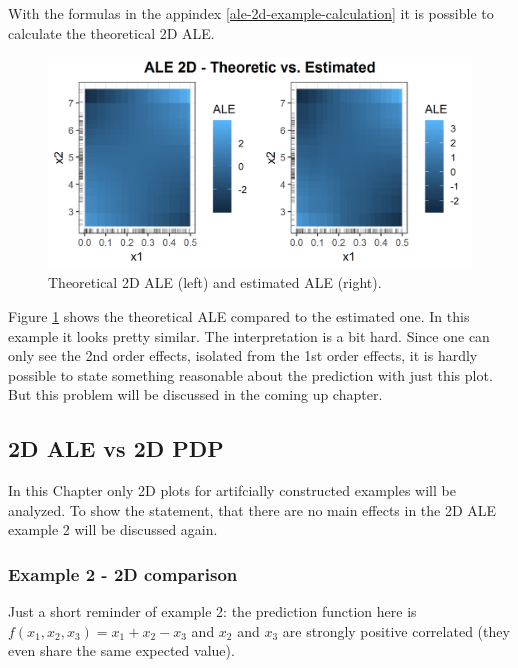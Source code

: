 \documentclass[
]{krantz}
\begin{document}
With the formulas in the appindex \ref{ale-2d-example-calculation} it is possible to calculate the theoretical 2D ALE.

\begin{figure}
\includegraphics[width=1\linewidth]{images/ale_1_ALE_2D_theo_vs_estim_x1x2x3_150_0_0p5_5_1} \caption{Theoretical 2D ALE (left) and estimated ALE (right).}\label{fig:theo2Dale}
\end{figure}



Figure \ref{fig:theo2Dale} shows the theoretical ALE compared to the estimated one. In this example it looks pretty similar. The interpretation is a bit hard. Since one can only see the 2nd order effects, isolated from the 1st order effects, it is hardly possible to state something reasonable about the prediction with just this plot. But this problem will be discussed in the coming up chapter.

\hypertarget{d-ale-vs-2d-pdp}{%
\subsection{2D ALE vs 2D PDP}\label{d-ale-vs-2d-pdp}}

In this Chapter only 2D plots for artifcially constructed examples will be analyzed. To show the statement, that there are no main effects in the 2D ALE example 2 will be discussed again.

\hypertarget{example-2---2d-comparison}{%
\subsubsection{Example 2 - 2D comparison}\label{example-2---2d-comparison}}

Just a short reminder of example 2: the prediction function here is \(f(x_1, x_2, x_3) = x_1 + x_2 - x_3\) and \(x_2\) and \(x_3\) are strongly positive correlated (they even share the same expected value).
\end{document}
